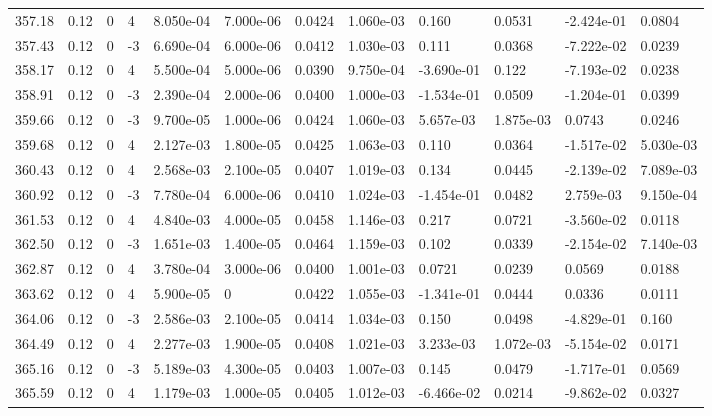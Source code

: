 \documentclass[preview]{standalone}
\begin{document}
{{{{{{{{{{{{{{{{{\begin{tabular}{L{1.2cm}C{1.2cm} C{0.3cm}C{0.5cm} C{1.4cm}C{1.4cm} C{1.4cm}C{1.4cm} C{1.6cm}C{1.6cm} C{1.6cm}C{1.6cm}}
  357.18  &  0.12  & 0     &  4 &  8.050e-04  & 7.000e-06  &  0.0424&   1.060e-03& 0.160 & 0.0531   &  -2.424e-01 & 0.0804  \\ 
  357.43  &  0.12  & 0     & -3 &  6.690e-04  & 6.000e-06  &  0.0412&   1.030e-03& 0.111 & 0.0368   &  -7.222e-02 & 0.0239  \\ 
  358.17  &  0.12  & 0     &  4 &  5.500e-04  & 5.000e-06  &  0.0390&   9.750e-04& -3.690e-01 & 0.122   &  -7.193e-02 & 0.0238  \\ 
  358.91  &  0.12  & 0     & -3 &  2.390e-04  & 2.000e-06  &  0.0400&   1.000e-03& -1.534e-01 & 0.0509   &  -1.204e-01 & 0.0399  \\ 
  359.66  &  0.12  & 0     & -3 &  9.700e-05  & 1.000e-06  &  0.0424&   1.060e-03& 5.657e-03 & 1.875e-03   &  0.0743 & 0.0246  \\ 
  359.68  &  0.12  & 0     &  4 &  2.127e-03  & 1.800e-05  &  0.0425&   1.063e-03& 0.110 & 0.0364   &  -1.517e-02 & 5.030e-03  \\ 
  360.43  &  0.12  & 0     &  4 &  2.568e-03  & 2.100e-05  &  0.0407&   1.019e-03& 0.134 & 0.0445   &  -2.139e-02 & 7.089e-03  \\ 
  360.92  &  0.12  & 0     & -3 &  7.780e-04  & 6.000e-06  &  0.0410&   1.024e-03& -1.454e-01 & 0.0482   &  2.759e-03 & 9.150e-04  \\ 
  361.53  &  0.12  & 0     &  4 &  4.840e-03  & 4.000e-05  &  0.0458&   1.146e-03& 0.217 & 0.0721   &  -3.560e-02 & 0.0118  \\ 
  362.50  &  0.12  & 0     & -3 &  1.651e-03  & 1.400e-05  &  0.0464&   1.159e-03& 0.102 & 0.0339   &  -2.154e-02 & 7.140e-03  \\ 
  362.87  &  0.12  & 0     &  4 &  3.780e-04  & 3.000e-06  &  0.0400&   1.001e-03& 0.0721 & 0.0239   &  0.0569 & 0.0188  \\ 
  363.62  &  0.12  & 0     &  4 &  5.900e-05  & 0  &  0.0422&   1.055e-03& -1.341e-01 & 0.0444   &  0.0336 & 0.0111  \\ 
  364.06  &  0.12  & 0     & -3 &  2.586e-03  & 2.100e-05  &  0.0414&   1.034e-03& 0.150 & 0.0498   &  -4.829e-01 & 0.160  \\ 
  364.49  &  0.12  & 0     &  4 &  2.277e-03  & 1.900e-05  &  0.0408&   1.021e-03& 3.233e-03 & 1.072e-03   &  -5.154e-02 & 0.0171  \\ 
  365.16  &  0.12  & 0     & -3 &  5.189e-03  & 4.300e-05  &  0.0403&   1.007e-03& 0.145 & 0.0479   &  -1.717e-01 & 0.0569  \\ 
  365.59  &  0.12  & 0     &  4 &  1.179e-03  & 1.000e-05  &  0.0405&   1.012e-03& -6.466e-02 & 0.0214   &  -9.862e-02 & 0.0327  \\ 

\end{tabular}}}}}}}}}}}}}}}}}}
\end{document}
